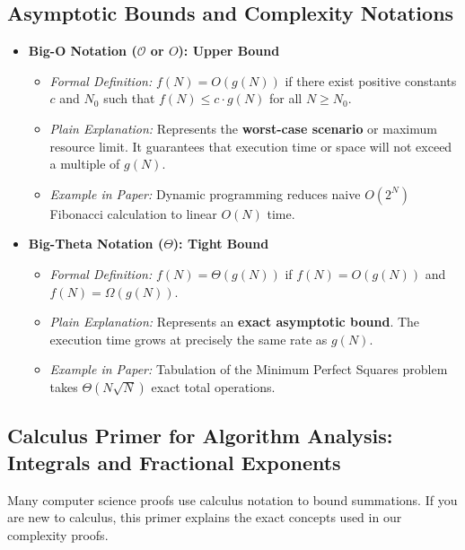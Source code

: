 \documentclass[10pt,journal,compsoc,onecolumn]{IEEEtran}
\begin{document}
\subsection{Asymptotic Bounds and Complexity Notations}

\begin{itemize}
    \item \textbf{Big-O Notation ($\mathcal{O}$ or $O$): Upper Bound}
    \begin{itemize}
        \item \emph{Formal Definition:} $f(N) = O(g(N))$ if there exist positive constants $c$ and $N_0$ such that $f(N) \le c \cdot g(N)$ for all $N \ge N_0$.
        \item \emph{Plain Explanation:} Represents the \textbf{worst-case scenario} or maximum resource limit. It guarantees that execution time or space will not exceed a multiple of $g(N)$.
        \item \emph{Example in Paper:} Dynamic programming reduces naive $O(2^N)$ Fibonacci calculation to linear $O(N)$ time.
    \end{itemize}

    \item \textbf{Big-Theta Notation ($\Theta$): Tight Bound}
    \begin{itemize}
        \item \emph{Formal Definition:} $f(N) = \Theta(g(N))$ if $f(N) = O(g(N))$ and $f(N) = \Omega(g(N))$.
        \item \emph{Plain Explanation:} Represents an \textbf{exact asymptotic bound}. The execution time grows at precisely the same rate as $g(N)$.
        \item \emph{Example in Paper:} Tabulation of the Minimum Perfect Squares problem takes $\Theta(N \sqrt{N})$ exact total operations.
    \end{itemize}
\end{itemize}

\subsection{Calculus Primer for Algorithm Analysis: Integrals and Fractional Exponents}

Many computer science proofs use calculus notation to bound summations. If you are new to calculus, this primer explains the exact concepts used in our complexity proofs.
\end{document}
